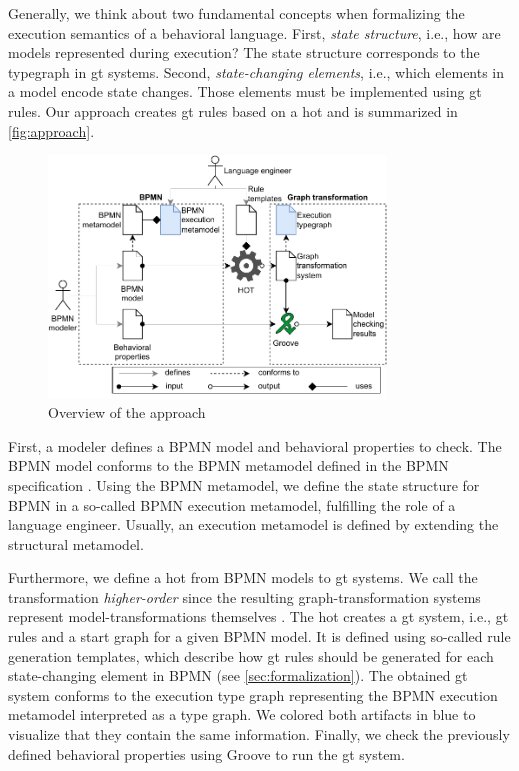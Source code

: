 \documentclass[runningheads]{llncs}
\begin{document}
Generally, we think about two fundamental concepts when formalizing the execution semantics of a behavioral language.
First, \textit{state structure}, i.e., how are models represented during execution?
The state structure corresponds to the typegraph in \gls*{gt} systems.
Second, \textit{state-changing elements}, i.e., which elements in a model encode state changes.
Those elements must be implemented using \gls*{gt} rules.
Our approach creates \gls*{gt} rules based on a \gls*{hot} and is summarized in \autoref{fig:approach}.

\begin{figure}[ht]
    \centering
    \includegraphics[width=0.8\textwidth]{images/bpmn_semantics-overview.pdf}
    \caption{Overview of the approach}
    \label{fig:approach}
\end{figure}

First, a modeler defines a BPMN model and behavioral properties to check.
The BPMN model conforms to the BPMN metamodel defined in the BPMN specification \cite{objectmanagementgroupBusinessProcessModel2013}.
Using the BPMN metamodel, we define the state structure for BPMN in a so-called BPMN execution metamodel, fulfilling the role of a language engineer.
Usually, an execution metamodel is defined by extending the structural metamodel.

Furthermore, we define a \gls*{hot} from BPMN models to \gls*{gt} systems.
We call the transformation \textit{higher-order} since the resulting graph-transformation systems represent model-transformations themselves \cite{tisiUseHigherOrderModel2009}.
The \gls*{hot} creates a \gls*{gt} system, i.e., \gls*{gt} rules and a start graph for a given BPMN model.
It is defined using so-called rule generation templates, which describe how \gls*{gt} rules should be generated for each state-changing element in BPMN (see \autoref{sec:formalization}).
The obtained \gls*{gt} system conforms to the execution type graph representing the BPMN execution metamodel interpreted as a type graph.
We colored both artifacts in blue to visualize that they contain the same information.
Finally, we check the previously defined behavioral properties using Groove to run the \gls*{gt} system.
\end{document}
